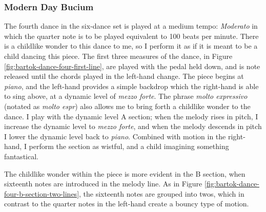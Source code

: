 \subsubsection{Modern Day Bucium}

The fourth dance in the six-dance set is played at a medium tempo: \textit{Moderato} in which the quarter note is to be played equivalent to 100 beats per minute. There is a childlike wonder to this dance to me, so I perform it as if it is meant to be a child dancing this piece. The first three measures of the dance, in Figure \ref{fig:bartok-dance-four-first-line}\autocite{Lung_2016}, are played with the pedal held down, and is note released until the chords played in the left-hand change. The piece begins at \textit{piano}, and the left-hand provides a simple backdrop which the right-hand is able to sing above, at a dynamic level of \textit{mezzo forte}. The phrase \textit{molto expressivo} (notated as \textit{molto espr}) also allows me to bring forth a childlike wonder to the dance. I play with the dynamic level A section; when the melody rises in pitch, I increase the dynamic level to \textit{mezzo forte}, and when the melody descends in pitch I lower the dynamic level back to \textit{piano}. Combined with motion in the right-hand, I perform the section as wistful, and a child imagining something fantastical.

The childlike wonder within the piece is more evident in the B section, when sixteenth notes are introduced in the melody line. As in Figure \ref{fig:bartok-dance-four-b-section-two-lines}\autocite{Lung_2016}, the sixteenth notes are grouped into twos, which in contrast to the quarter notes in the left-hand create a bouncy type of motion. 


